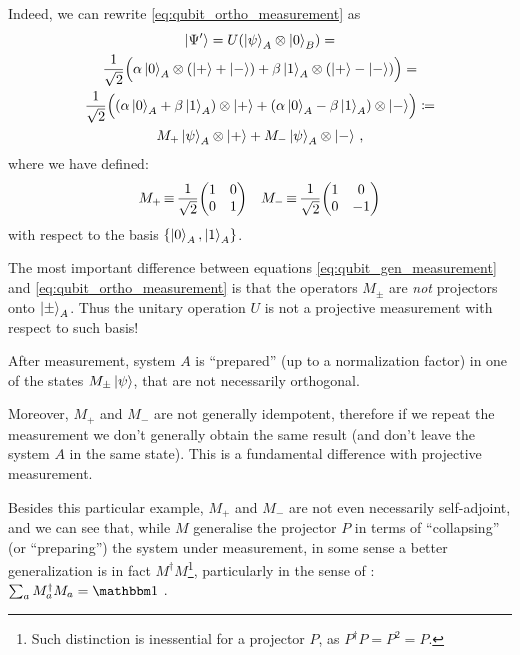 Indeed, we can rewrite \eqref{eq:qubit_ortho_measurement} as
\begin{multline}\label{eq:qubit_gen_measurement}
  \ket{\Psi'}                                               =
  U( \ket{\psi}_A \otimes \ket{0}_B )                           =         \\
  \frac{1}{\sqrt{2}} \qty\Big(
    \alpha\ket{0}_A \otimes \qty(\ket{+}+\ket{-}) +
    \beta \ket{1}_A \otimes \qty(\ket{+}-\ket{-})
  )                                                         =         \\
  \frac{1}{\sqrt{2}} \qty\Big(
    \qty(\alpha\ket{0}_A + \beta\ket{1}_A) \otimes \ket{+} +
    \qty(\alpha\ket{0}_A - \beta\ket{1}_A) \otimes \ket{-}
  )                                               \coloneqq            \\
  M_+\ket{\psi}_A \otimes \ket{+} + M_-\ket{\psi}_A \otimes \ket{-}
  \,\text{,}
\end{multline}
where we have defined:
\begin{align*}
  &
  M_+ \repr \frac{1}{\sqrt{2}}\mqty(\imat{2})
  &
  M_- \repr \frac{1}{\sqrt{2}}\mqty(1& 0\\0& -1)
\end{align*}
with respect to the basis $\left\{\ket{0}_A, \ket{1}_A\right\}$.

The most important difference between equations \eqref{eq:qubit_gen_measurement}
and \eqref{eq:qubit_ortho_measurement} is that
the o\-per\-a\-tors $M_{\pm}$ are \emph{not} projectors onto $\ket{\pm}_A$.
Thus the unitary operation $U$ is not a projective measurement
with respect to such basis!

After measurement, system $A$ is ``prepared''
(up to a normalization factor)
in one of the states $M_{\pm}\ket{\psi}$,
that are not necessarily orthogonal.

Moreover, $M_+$ and $M_-$ are not generally idempotent,
therefore if we repeat the measurement we don't generally
obtain the same result (and don't leave the system $A$ in the same state).
This is a fundamental difference with projective measurement.

Besides this particular example, $M_+$ and $M_-$ are not even necessarily
self-adjoint, and we can see that, while $M$ generalise the projector $P$
in terms of ``collapsing'' (or ``preparing'') the system under measurement,
in some sense a better generalization is in fact $M^{\dagger}M$\footnote{
  Such distinction is inessential for a projector $P$,
  as $P^{\dagger}P = P^2 = P$.
}, particularly in the sense of :
$\sum_a M_a^{\dagger}M_a = \idop$ \parencite[sec.3.1]{PreskillNotes}.

